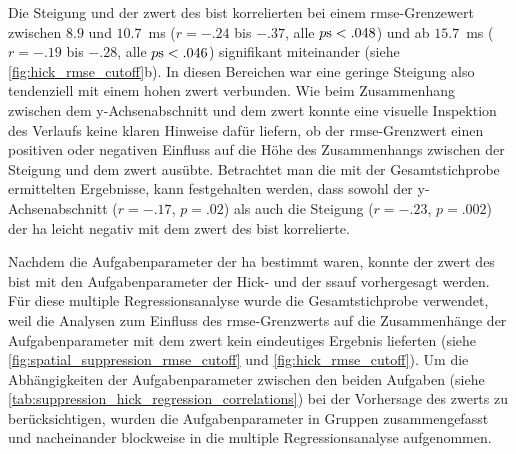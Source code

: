\documentclass[11pt, twoside, a4paper]{book}		%
\begin{document}
Die Steigung und der \gls{zwert} des \gls{bist} korrelierten bei einem \gls{rmse}-Grenzewert zwischen $8.9$ und $10.7$~ms ($r = -.24$ bis $ -.37$, alle $p\textnormal{s} < .048$) und ab $15.7$~ms ($r = -.19$ bis $ -.28$, alle $p\textnormal{s} < .046$) signifikant miteinander (siehe \autoref{fig:hick_rmse_cutoff}b). In diesen Bereichen war eine geringe Steigung also tendenziell mit einem hohen \gls{zwert} verbunden. Wie beim Zusammenhang zwischen dem y-Achsenabschnitt und dem \gls{zwert} konnte eine visuelle Inspektion des Verlaufs keine klaren Hinweise dafür liefern, ob der \gls{rmse}-Grenzwert einen positiven oder negativen Einfluss auf die Höhe des Zusammenhangs zwischen der Steigung und dem \gls{zwert} ausübte.
Betrachtet man die mit der Gesamtstichprobe ermittelten Ergebnisse, kann festgehalten werden, dass sowohl der y-Achsenabschnitt ($r=-.17$, $p=.02$) als auch die Steigung ($r=-.23$, $p=.002$) der \gls{ha} leicht negativ mit dem \gls{zwert} des \gls{bist} korrelierte. %

Nachdem die Aufgabenparameter der \gls{ha} bestimmt waren, konnte der \gls{zwert} des \gls{bist} mit den Aufgabenparameter der Hick- und der \gls{ssauf} vorhergesagt werden. Für diese multiple Regressionsanalyse wurde die Gesamtstichprobe verwendet, weil die Analysen zum Einfluss des \gls{rmse}-Grenzwerts auf die Zusammenhänge der Aufgabenparameter mit dem \gls{zwert} kein eindeutiges Ergebnis lieferten (siehe \autoref{fig:spatial_suppression_rmse_cutoff} und \autoref{fig:hick_rmse_cutoff}). Um die Abhängigkeiten der Aufgabenparameter zwischen den beiden Aufgaben (siehe \autoref{tab:suppression_hick_regression_correlations}) bei der Vorhersage des \gls{zwert}s zu berücksichtigen, wurden die Aufgabenparameter in Gruppen zusammengefasst und nacheinander blockweise in die multiple Regressionsanalyse aufgenommen. 
\end{document}
